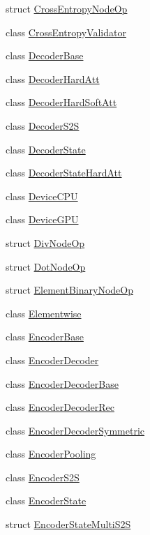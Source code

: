 \begin{DoxyCompactItemize}
\item 
struct \hyperlink{structmarian_1_1CrossEntropyNodeOp}{Cross\+Entropy\+Node\+Op}
\item 
class \hyperlink{classmarian_1_1CrossEntropyValidator}{Cross\+Entropy\+Validator}
\item 
class \hyperlink{classmarian_1_1DecoderBase}{Decoder\+Base}
\item 
class \hyperlink{classmarian_1_1DecoderHardAtt}{Decoder\+Hard\+Att}
\item 
class \hyperlink{classmarian_1_1DecoderHardSoftAtt}{Decoder\+Hard\+Soft\+Att}
\item 
class \hyperlink{classmarian_1_1DecoderS2S}{Decoder\+S2S}
\item 
class \hyperlink{classmarian_1_1DecoderState}{Decoder\+State}
\item 
class \hyperlink{classmarian_1_1DecoderStateHardAtt}{Decoder\+State\+Hard\+Att}
\item 
class \hyperlink{classmarian_1_1DeviceCPU}{Device\+C\+PU}
\item 
class \hyperlink{classmarian_1_1DeviceGPU}{Device\+G\+PU}
\item 
struct \hyperlink{structmarian_1_1DivNodeOp}{Div\+Node\+Op}
\item 
struct \hyperlink{structmarian_1_1DotNodeOp}{Dot\+Node\+Op}
\item 
struct \hyperlink{structmarian_1_1ElementBinaryNodeOp}{Element\+Binary\+Node\+Op}
\item 
class \hyperlink{classmarian_1_1Elementwise}{Elementwise}
\item 
class \hyperlink{classmarian_1_1EncoderBase}{Encoder\+Base}
\item 
class \hyperlink{classmarian_1_1EncoderDecoder}{Encoder\+Decoder}
\item 
class \hyperlink{classmarian_1_1EncoderDecoderBase}{Encoder\+Decoder\+Base}
\item 
class \hyperlink{classmarian_1_1EncoderDecoderRec}{Encoder\+Decoder\+Rec}
\item 
class \hyperlink{classmarian_1_1EncoderDecoderSymmetric}{Encoder\+Decoder\+Symmetric}
\item 
class \hyperlink{classmarian_1_1EncoderPooling}{Encoder\+Pooling}
\item 
class \hyperlink{classmarian_1_1EncoderS2S}{Encoder\+S2S}
\item 
class \hyperlink{classmarian_1_1EncoderState}{Encoder\+State}
\item 
struct \hyperlink{structmarian_1_1EncoderStateMultiS2S}{Encoder\+State\+Multi\+S2S}

\end{DoxyCompactItemize}
